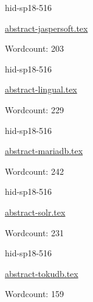 

\begin{IU}

hid-sp18-516

\href{https://github.com/cloudmesh-community/hid-sp18-516/blob/master//technology/abstract-jaspersoft.tex}{abstract-jaspersoft.tex}

 

Wordcount: 203

\end{IU}



\begin{IU}

hid-sp18-516

\href{https://github.com/cloudmesh-community/hid-sp18-516/blob/master//technology/abstract-lingual.tex}{abstract-lingual.tex}

 

Wordcount: 229

\end{IU}



\begin{IU}

hid-sp18-516

\href{https://github.com/cloudmesh-community/hid-sp18-516/blob/master//technology/abstract-mariadb.tex}{abstract-mariadb.tex}

 

Wordcount: 242

\end{IU}



\begin{IU}

hid-sp18-516

\href{https://github.com/cloudmesh-community/hid-sp18-516/blob/master//technology/abstract-solr.tex}{abstract-solr.tex}

 

Wordcount: 231

\end{IU}



\begin{IU}

hid-sp18-516

\href{https://github.com/cloudmesh-community/hid-sp18-516/blob/master//technology/abstract-tokudb.tex}{abstract-tokudb.tex}

 

Wordcount: 159

\end{IU}


